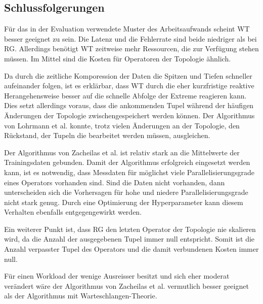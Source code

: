 \subsection{Schlussfolgerungen}

Für das in der Evaluation verwendete Muster des Arbeitsaufwands scheint WT besser geeignet zu sein.
Die Latenz und die Fehlerrate sind beide niedriger als bei RG.
Allerdings benötigt WT zeitweise mehr Ressourcen, die zur Verfügung stehen müssen.
Im Mittel sind die Kosten für Operatoren der Topologie ähnlich.

Da durch die zeitliche Komporession der Daten die Spitzen und Tiefen schneller aufeinander folgen, ist es erklärbar, dass WT durch die eher kurzfristige reaktive Herangehensweise besser auf die schnelle Abfolge der Extreme reagieren kann.
Dies setzt allerdings voraus, dass die ankommenden Tupel während der häufigen Änderungen der Topologie zwischengespeichert werden können.
Der Algorithmus von Lohrmann et al. konnte, trotz vielen Änderungen an der Topologie, den Rückstand, der Tupeln die bearbeitet werden müssen, ausgleichen.

Der Algorithmus von Zacheilas et al. ist relativ stark an die Mittelwerte der Trainingsdaten gebunden.
Damit der Algorithmus erfolgreich eingesetzt werden kann, ist es notwendig, dass Messdaten für möglichst viele Parallelisierungsgrade eines Operators vorhanden sind.
Sind die Daten nicht vorhanden, dann unterscheiden sich die Vorhersagen für hohe und niedere Parallelisierungsgrade nicht stark genug.
Durch eine Optimierung der Hyperparameter kann diesem Verhalten ebenfalls entgegengewirkt werden.

Ein weiterer Punkt ist, dass RG den letzten Operator der Topologie nie skalieren wird, da die Anzahl der ausgegebenen Tupel immer null entspricht.
Somit ist die Anzahl verpasster Tupel des Operators und die damit verbundenen Kosten immer null.

Für einen Workload der wenige Ausreisser besitzt und sich eher moderat verändert wäre der Algorithmus von Zacheilas et al. vermutlich besser geeignet als der Algorithmus mit Warteschlangen-Theorie. 


